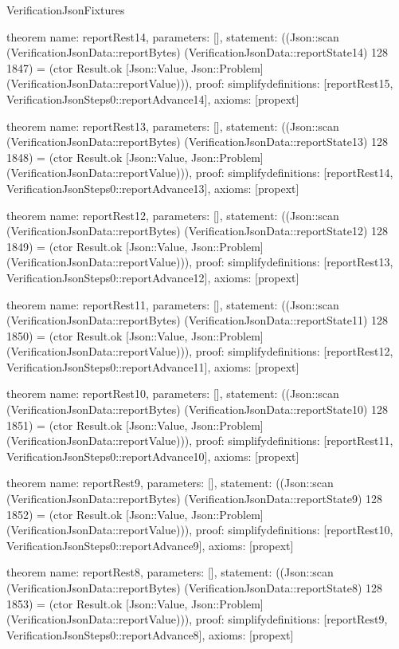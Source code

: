 \begin{lexlean}{VerificationJsonFixtures}
\begin{semanticmodule}
theorem{
  name: reportRest14,
  parameters: [],
  statement: ((Json::scan (VerificationJsonData::reportBytes) (VerificationJsonData::reportState14) 128 1847) = (ctor Result.ok [Json::Value, Json::Problem] (VerificationJsonData::reportValue))),
  proof: simplify{definitions: [reportRest15, VerificationJsonSteps0::reportAdvance14]},
  axioms: [propext]
}

theorem{
  name: reportRest13,
  parameters: [],
  statement: ((Json::scan (VerificationJsonData::reportBytes) (VerificationJsonData::reportState13) 128 1848) = (ctor Result.ok [Json::Value, Json::Problem] (VerificationJsonData::reportValue))),
  proof: simplify{definitions: [reportRest14, VerificationJsonSteps0::reportAdvance13]},
  axioms: [propext]
}

theorem{
  name: reportRest12,
  parameters: [],
  statement: ((Json::scan (VerificationJsonData::reportBytes) (VerificationJsonData::reportState12) 128 1849) = (ctor Result.ok [Json::Value, Json::Problem] (VerificationJsonData::reportValue))),
  proof: simplify{definitions: [reportRest13, VerificationJsonSteps0::reportAdvance12]},
  axioms: [propext]
}

theorem{
  name: reportRest11,
  parameters: [],
  statement: ((Json::scan (VerificationJsonData::reportBytes) (VerificationJsonData::reportState11) 128 1850) = (ctor Result.ok [Json::Value, Json::Problem] (VerificationJsonData::reportValue))),
  proof: simplify{definitions: [reportRest12, VerificationJsonSteps0::reportAdvance11]},
  axioms: [propext]
}

theorem{
  name: reportRest10,
  parameters: [],
  statement: ((Json::scan (VerificationJsonData::reportBytes) (VerificationJsonData::reportState10) 128 1851) = (ctor Result.ok [Json::Value, Json::Problem] (VerificationJsonData::reportValue))),
  proof: simplify{definitions: [reportRest11, VerificationJsonSteps0::reportAdvance10]},
  axioms: [propext]
}

theorem{
  name: reportRest9,
  parameters: [],
  statement: ((Json::scan (VerificationJsonData::reportBytes) (VerificationJsonData::reportState9) 128 1852) = (ctor Result.ok [Json::Value, Json::Problem] (VerificationJsonData::reportValue))),
  proof: simplify{definitions: [reportRest10, VerificationJsonSteps0::reportAdvance9]},
  axioms: [propext]
}

theorem{
  name: reportRest8,
  parameters: [],
  statement: ((Json::scan (VerificationJsonData::reportBytes) (VerificationJsonData::reportState8) 128 1853) = (ctor Result.ok [Json::Value, Json::Problem] (VerificationJsonData::reportValue))),
  proof: simplify{definitions: [reportRest9, VerificationJsonSteps0::reportAdvance8]},
  axioms: [propext]
}


\end{semanticmodule}
\end{lexlean}
